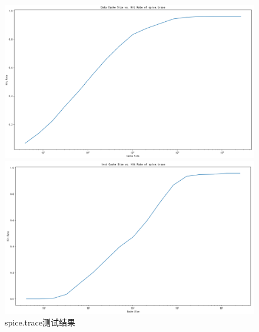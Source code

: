 \documentclass[12pt,hyperref,a4paper,UTF8]{ctexart}
\begin{document}
\begin{figure}[H]
    \centering
    \begin{minipage}[b]{0.45\textwidth}
        \centering
        \includegraphics[width=\textwidth]{./figures/fig/image15.png}
    \end{minipage}
    \hfill
    \begin{minipage}[b]{0.45\textwidth}
        \centering
        \includegraphics[width=\textwidth]{./figures/fig/image16.png}
    \end{minipage}
    \caption{spice.trace测试结果}
\end{figure}
\end{document}
